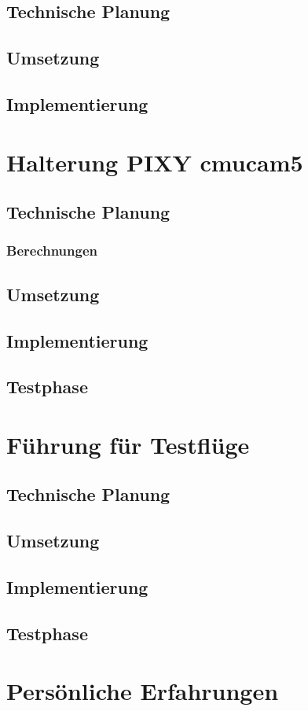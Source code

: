	\subsection{Technische Planung}

	\subsection{Umsetzung}

	\subsection{Implementierung}

\section{Halterung PIXY cmucam5}

	\subsection{Technische Planung}

		\subsubsection{Berechnungen}

	\subsection{Umsetzung}

	\subsection{Implementierung}

	\subsection{Testphase}

\section{Führung für Testflüge}

	\subsection{Technische Planung}

	\subsection{Umsetzung}

	\subsection{Implementierung}

	\subsection{Testphase}

\section{Persönliche Erfahrungen}